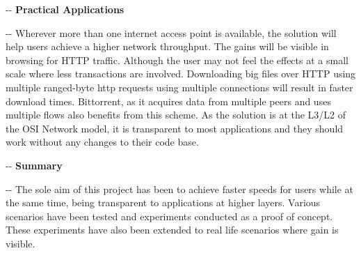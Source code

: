 \documentclass[12pt]{article}
\makeatletter
\newenvironment{indentation}[3]%
	{\par\setlength{\parindent}{#3}
	\setlength{\leftmargin}{#1}       \setlength{\rightmargin}{#1}%
	\advance\linewidth -\leftmargin       \advance\linewidth -\rightmargin%
	\advance\@totalleftmargin\leftmargin  \@setpar{{\@@par}}%
	\parshape 1\@totalleftmargin \linewidth\ignorespaces}{\par}%
\makeatother
\begin{document}
\begin{indentation}{0pt}{0pt}{0pt}
\vspace{1cm}
\textbf{{{\Large Practical Applications}}}
\end{indentation}
\vspace{0.5cm}

\begin{indentation}{0pt}{0pt}{0pt}
{\normalsize \hspace{1cm} Wherever more than one internet access point is available, the solution will help users achieve a higher network throughput. The gains will be visible in browsing for HTTP traffic. Although the user may not feel the effects at a small scale where less transactions are involved. Downloading big files over HTTP using multiple ranged-byte http requests using multiple connections will result in faster download times. Bittorrent, as it acquires data from multiple peers and uses multiple flows also benefits from this scheme. As the solution is at the L3/L2 of the OSI Network model, it is transparent to most applications and they should work without any changes to their code base.}
\end{indentation}

\begin{indentation}{0pt}{0pt}{0pt}
\vspace{1cm}
\textbf{{{\Large Summary}}}
\end{indentation}
\vspace{0.5cm}

\begin{indentation}{0pt}{0pt}{0pt}
{\normalsize \hspace{1cm} The sole aim of this project has been to achieve faster speeds for users while at the same time, being transparent to applications at higher layers. Various scenarios have been tested and experiments conducted as a proof of concept. These experiments have also been extended to real life scenarios where gain is visible.}
\end{indentation}
\end{document}
